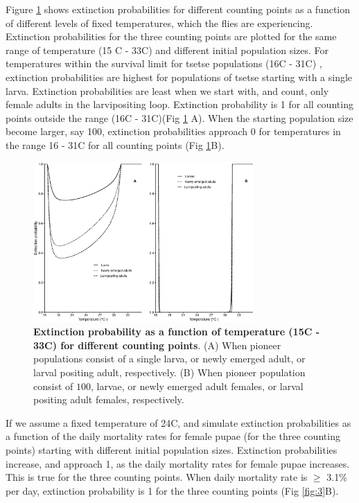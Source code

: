 \documentclass[smallextended]{svjour3}
\begin{document}
Figure \ref{fig:2} shows extinction probabilities for different counting points as a function of different levels of fixed temperatures, which the flies are experiencing. Extinction probabilities for the three counting points are plotted for the same range of temperature (15 \degree C - 33\degree C) and different initial population sizes. For temperatures within the survival limit for tsetse populations (16\degree C - 31\degree C) \cite{Are2019}, extinction probabilities are highest for populations of tsetse starting with a single larva. Extinction probabilities are least when we start with, and count, only female adults in the larvipositing loop. Extinction probability is 1 for all counting points outside the range (16\degree C - 31\degree C)(Fig \ref{fig:2} A).  When the starting population size become larger, say 100, extinction probabilities approach 0 for temperatures in the range  16 - 31\degree C for all counting points (Fig \ref{fig:2}B).


\begin{figure}[h]
	\includegraphics[width=0.75\textwidth]{Nov26-1.eps}
	\caption{{\bf Extinction probability as a function of temperature (15\degree C - 33\degree C) for different counting points}. (A) When pioneer populations consist of  a single larva, or newly emerged adult, or larval positing adult, respectively. (B) When pioneer population consist of  $100$, larvae, or newly emerged adult females, or larval positing adult females, respectively.}
	\label{fig:2}       %
\end{figure}
%
\newpage

 If we assume a fixed temperature of 24\degree C, and simulate extinction probabilities  as a function of the daily mortality rates for female pupae (for the three counting points) starting with different initial population sizes. Extinction probabilities increase, and approach 1, as the daily mortality rates for female pupae increases. This is true for the three counting points. When daily mortality rate is $\geq$ 3.1\% per day, extinction probability is 1 for the three counting points (Fig \ref{fig:3}B).   
\end{document}
